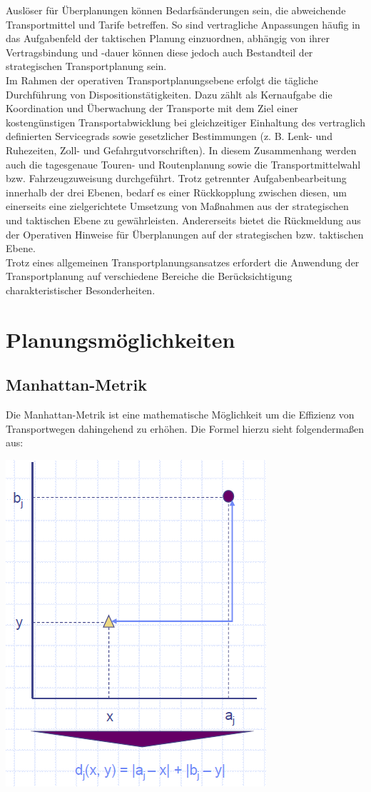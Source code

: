 \documentclass[a4paper,12pt]{scrreprt}
\begin{document}
	Auslöser für Überplanungen können Bedarfsänderungen sein, die abweichende Transportmittel und Tarife betreffen. So sind vertragliche Anpassungen häufig in das Aufgabenfeld der taktischen Planung einzuordnen, abhängig von ihrer Vertragsbindung und -dauer können diese jedoch auch Bestandteil der strategischen Transportplanung sein.\\
	
	Im Rahmen der operativen Transportplanungsebene erfolgt die tägliche Durchführung von Dispositionstätigkeiten. Dazu zählt als Kernaufgabe die Koordination und Überwachung der Transporte mit dem Ziel einer kostengünstigen Transportabwicklung bei gleichzeitiger Einhaltung des vertraglich definierten Servicegrads sowie gesetzlicher Bestimmungen (z. B. Lenk- und Ruhezeiten, Zoll- und Gefahrgutvorschriften). In diesem Zusammenhang werden auch die tagesgenaue Touren- und Routenplanung sowie die Transportmittelwahl bzw. Fahrzeugzuweisung durchgeführt. Trotz getrennter Aufgabenbearbeitung innerhalb der drei Ebenen, bedarf es einer Rückkopplung zwischen diesen, um einerseits eine zielgerichtete Umsetzung von Maßnahmen aus der strategischen und taktischen Ebene zu gewährleisten. Andererseits bietet die Rückmeldung aus der Operativen Hinweise für Überplanungen auf der strategischen bzw. taktischen Ebene.\\ 
	
	Trotz eines allgemeinen Transportplanungsansatzes erfordert die Anwendung der Transportplanung auf verschiedene Bereiche die Berücksichtigung charakteristischer Besonderheiten.\\

	\chapter{Planungsmöglichkeiten}
	\section{Manhattan-Metrik}
	Die Manhattan-Metrik ist eine mathematische Möglichkeit um die Effizienz von Transportwegen dahingehend zu erhöhen. Die Formel hierzu sieht folgendermaßen aus:
	\begin{center}
\includegraphics[width=0.5\linewidth]{./Bilder/rechtwinklig}
\end{center}
\end{document}
